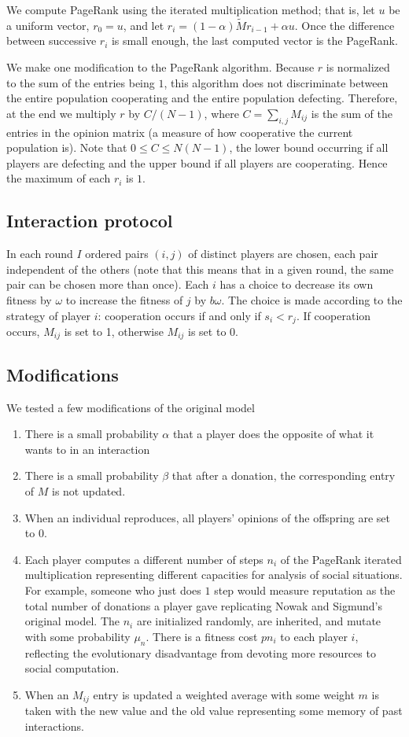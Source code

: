 \documentclass{amsart}
\begin{document}
We compute PageRank using the iterated multiplication method; that is,
let $u$ be a uniform vector, $r_0 = u$, and let $r_i =
(1-\alpha)\tilde M r_{i-1} + \alpha u$. Once the difference between
successive $r_i$ is small enough, the last computed vector is the
PageRank.

We make one modification to the PageRank algorithm. Because $r$ is
normalized to the sum of the entries being $1$, this algorithm does
not discriminate between the entire population cooperating and the
entire population defecting. Therefore, at the end we multiply $r$ by
$C/(N-1)$, where $C = \sum_{i,j} M_{ij}$ is the sum of the entries in
the opinion matrix (a measure of how cooperative the current
population is). Note that $0 \le C \le N(N-1)$, the lower bound
occurring if all players are defecting and the upper bound if all
players are cooperating. Hence the maximum of each $r_i$ is $1$.

\subsection{Interaction protocol}
In each round $I$ ordered pairs $(i,j)$ of distinct players are
chosen, each pair independent of the others (note that this means that
in a given round, the same pair can be chosen more than once). Each
$i$ has a choice to decrease its own fitness by $\omega$ to increase
the fitness of $j$ by $b \omega$. The choice is made according to the
strategy of player $i$: cooperation occurs if and only if $s_i <
r_j$. If cooperation occurs, $M_{ij}$ is set to 1, otherwise
$M_{ij}$ is set to $0$.

\subsection{Modifications}
We tested a few modifications of the original model
\begin{enumerate}
\item
There is a small probability $\alpha$ that a player does the opposite
of what it wants to in an interaction
\item
There is a small probability $\beta$ that after a donation, the
corresponding entry of $M$ is not updated.
\item
When an individual reproduces, all players' opinions of the offspring
are set to 0.
\item
Each player computes a different number of steps $n_i$ of the PageRank
iterated multiplication representing different capacities for analysis
of social situations. For example, someone who just does $1$ step
would measure reputation as the total number of donations a player
gave replicating Nowak and Sigmund's original model. The $n_i$ are
initialized randomly, are inherited, and mutate with some probability
$\mu_n$. There is a fitness cost $p n_i$ to each player $i$,
reflecting the evolutionary disadvantage from devoting more resources
to social computation.
\item
When an $M_{ij}$ entry is updated a weighted average with some weight
$m$ is taken with the new value and the old value representing some
memory of past interactions.
\end{enumerate}
\end{document}
